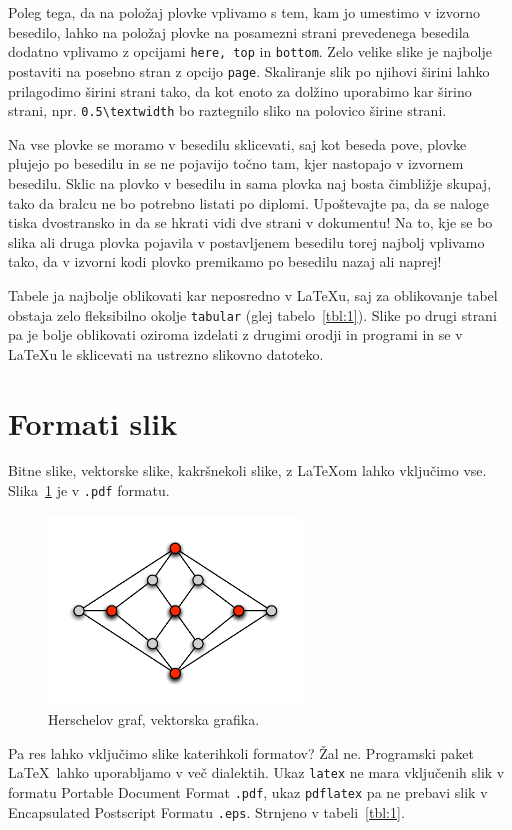\documentclass[a4paper, 12pt]{book}
\begin{document}
Poleg tega, da na položaj plovke vplivamo s tem, kam jo umestimo v izvorno besedilo, lahko na položaj plovke na posamezni strani prevedenega besedila dodatno vplivamo z opcijami \texttt{here, top} in \texttt{bottom}.
Zelo velike slike je najbolje postaviti na posebno stran z opcijo \texttt{page}.
Skaliranje slik po njihovi širini lahko prilagodimo širini strani tako, da kot enoto za dolžino uporabimo kar širino strani, npr. \verb=0.5\textwidth= bo raztegnilo sliko na polovico širine strani.

Na vse plovke se moramo v besedilu sklicevati, saj kot beseda pove, plovke plujejo po besedilu in se ne pojavijo točno tam, kjer nastopajo v izvornem besedilu.
Sklic na plovko v besedilu in sama plovka naj bosta čimbližje skupaj, tako da bralcu ne bo potrebno listati po diplomi. 
Upoštevajte pa, da se naloge tiska dvostransko in da se hkrati vidi dve strani v dokumentu!
Na to, kje se bo slika ali druga plovka pojavila v postavljenem besedilu torej najbolj vplivamo tako, da v izvorni kodi plovko premikamo po besedilu nazaj ali naprej!

Tabele ja najbolje oblikovati kar neposredno v \LaTeX u, saj za oblikovanje tabel obstaja zelo fleksibilno okolje \texttt{tabular} (glej tabelo~\ref{tbl:1}).
Slike po drugi strani pa je bolje oblikovati oziroma izdelati z drugimi orodji in programi in se v \LaTeX u le sklicevati na ustrezno slikovno datoteko.


\section{Formati slik}

Bitne slike, vektorske slike, kakršnekoli slike, z \LaTeX{}om lahko vključimo vse.
Slika~\ref{pic1} je v {\tt .pdf} formatu.
\begin{figure}[h]
\begin{center}
\includegraphics[width=0.6\textwidth]{pic1.pdf}
\end{center}
\caption{Herschelov graf, vektorska grafika.}
\label{pic1}
\end{figure}
Pa res lahko vključimo slike katerihkoli formatov? 
Žal ne. 
Programski paket \LaTeX\ lahko uporabljamo v več dialektih. 
Ukaz {\tt latex} ne mara vključenih slik v formatu Portable Document Format {\tt .pdf}, ukaz {\tt pdflatex} pa ne prebavi slik v Encapsulated Postscript Formatu {\tt .eps}.
Strnjeno v tabeli~\ref{tbl:1}.
\end{document}
